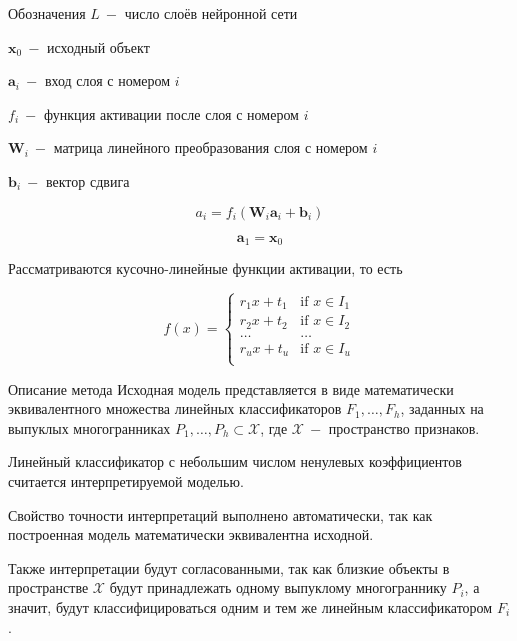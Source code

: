 \documentclass{beamer}
\begin{document}
\begin{frame}{Обозначения}
$L~-$ число слоёв нейронной сети

$\mathbf{x}_0~-$ исходный объект

$\mathbf{a}_i~-$ вход слоя с номером $i$

$f_i~-$ функция активации после слоя с номером $i$

$\mathbf{W}_i~-$ матрица линейного преобразования слоя с номером $i$

$\mathbf{b}_i~-$ вектор сдвига

$$a_i=f_i\left(\mathbf{W}_i \mathbf{a}_{i} + \mathbf{b}_i\right)$$

$$\mathbf{a}_1=\mathbf{x}_0$$

Рассматриваются кусочно-линейные функции активации, то есть

\[f(x)=\left\{
\begin{array}{ll}
      r_1 x+t_1 & \text{if } x\in I_1 \\
      r_2 x+t_2 & \text{if } x\in I_2 \\
      \dots&\dots\\
      r_u x+t_u & \text{if } x\in I_u \\
\end{array} 
\right. \]
\end{frame}
\begin{frame}{Описание метода}
Исходная модель представляется в виде математически эквивалентного множества линейных классификаторов $F_1,\dots,F_h$, заданных на выпуклых многогранниках $P_1,\dots,P_h\subset \mathcal{X}$, где $\mathcal{X}~-$ пространство признаков.
\bigskip

Линейный классификатор с небольшим числом ненулевых коэффициентов считается интерпретируемой моделью.
\bigskip

Свойство точности интерпретаций выполнено автоматически, так как построенная модель математически эквивалентна исходной.
\bigskip

Также интерпретации будут согласованными, так как близкие объекты в пространстве $\mathcal{X}$ будут принадлежать одному выпуклому многограннику $P_i$, а значит, будут классифицироваться одним и тем же линейным классификатором $F_i$.

\end{frame}
\end{document}
